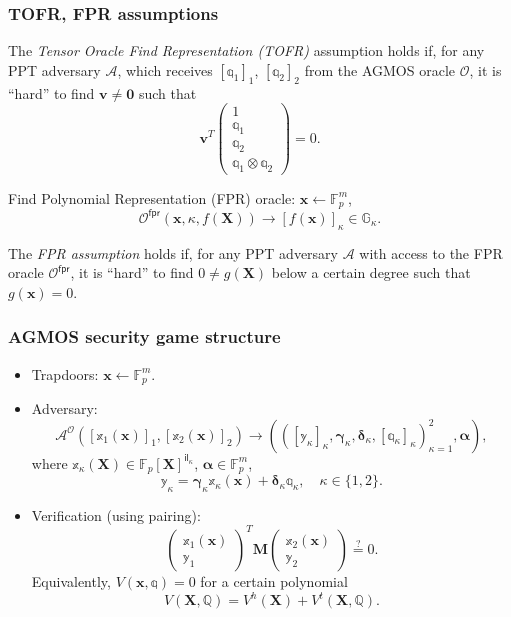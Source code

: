 \documentclass[9pt]{beamer}
\newcommand{\F}{\mathbb{F}}
\newcommand{\G}{\mathbb{G}}
\newcommand{\A}{\mathcal A}  %
\newcommand{\Oracle}{\mathcal{O}}  %
\newcommand{\il}{\mathsf{il}}  %
\newcommand{\fpr}{\mathsf{fpr}}  %
\begin{document}
\begin{frame}
\frametitle{TOFR, FPR assumptions}
\begin{definition}
    The \emph{Tensor Oracle Find Representation (TOFR)} assumption holds if, for any PPT adversary $ \A $, which receives $ [\mathbb q_1]_1 $, $ [\mathbb q_2]_2 $ from the AGMOS oracle $ \Oracle $, it is ``hard'' to find $ \bm v \neq \bm 0 $ such that
    \[
    \bm v^T 
    \begin{pmatrix}
         1 \\
         \mathbb q_1 \\
         \mathbb q_2 \\
         \mathbb q_1 \otimes \mathbb q_2
    \end{pmatrix}
    = 0.
    \]
\end{definition}
Find Polynomial Representation (FPR) oracle: $ \bm x \gets \F_p^m $, 
\[ 
\Oracle^\fpr(\bm x, \kappa, f(\bm X)) \to [f(\bm x)]_\kappa \in \G_\kappa.
\]
\begin{definition}
    The \textit{FPR assumption} holds if, for any PPT adversary $ \A $ with access to the FPR oracle $ \Oracle^\fpr $, it is ``hard'' to find $ 0 \neq g(\bm X) $ below a certain degree such that $ g(\bm x) = 0 $.
\end{definition}
\end{frame}


\begin{frame}
\frametitle{AGMOS security game structure}
\begin{itemize}
    \item Trapdoors: $ \bm x \gets \F_p^m $.
    \item Adversary:
    \[
    \A^\Oracle([\mathbb x_1(\bm x)]_1, [\mathbb x_2(\bm x)]_2) \to
    (([\mathbb y_\kappa]_\kappa, \bm \gamma_\kappa, \bm \delta_\kappa, [\mathbb q_\kappa]_\kappa)_{\kappa=1}^2, \bm \alpha),
    \]
    where $ \mathbb x_\kappa(\bm X) \in \F_p[\bm X]^{\il_\kappa} $, $ \bm \alpha \in \F_p^m $, 
    \[
    \mathbb y_\kappa = \bm{\gamma}_\kappa \mathbb x_\kappa(\bm x) + \bm \delta_\kappa \mathbb q_\kappa, \quad 
    \kappa \in \{ 1, 2 \}.
    \]
    \item Verification (using pairing):
    \[
        \begin{pmatrix}
           \mathbb x_1(\bm x) \\
           \mathbb y_1
        \end{pmatrix}^T
        \bm M
        \begin{pmatrix}
           \mathbb x_2(\bm x) \\
           \mathbb y_2
        \end{pmatrix} \overset{?}{=} 0.
    \]
    Equivalently, $ V(\bm x, \mathbb q) = 0 $ for a certain polynomial
    \[
    V(\bm X, \mathbb Q) = V^h(\bm X) + V^t(\bm X, \mathbb Q).
    \]
\end{itemize}
\end{frame}
\end{document}
